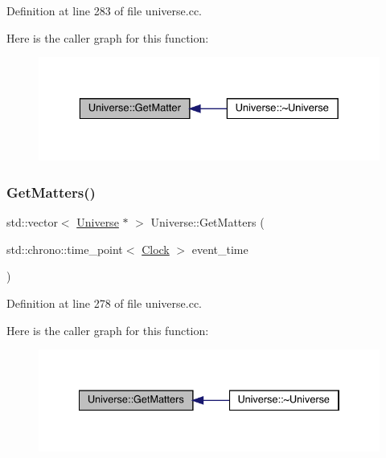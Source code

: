 Definition at line 283 of file universe.\+cc.

Here is the caller graph for this function\+:
\nopagebreak
\begin{figure}[H]
\begin{center}
\leavevmode
\includegraphics[width=329pt]{class_universe_a69de663cf2e32e65ed28c44ae666db3a_icgraph}
\end{center}
\end{figure}
\mbox{\label{class_universe_a4307a62e183fed8cf2b92be0f6014688}} 
\subsubsection{\texorpdfstring{Get\+Matters()}{GetMatters()}}
{\footnotesize\ttfamily std\+::vector$<$ \hyperlink{class_universe}{Universe} $\ast$ $>$ Universe\+::\+Get\+Matters (\begin{DoxyParamCaption}\item[{std\+::chrono\+::time\+\_\+point$<$ \hyperlink{universe_8h_a0ef8d951d1ca5ab3cfaf7ab4c7a6fd80}{Clock} $>$}]{event\+\_\+time }\end{DoxyParamCaption})}



Definition at line 278 of file universe.\+cc.

Here is the caller graph for this function\+:
\nopagebreak
\begin{figure}[H]
\begin{center}
\leavevmode
\includegraphics[width=334pt]{class_universe_a4307a62e183fed8cf2b92be0f6014688_icgraph}
\end{center}
\end{figure}
\mbox{\label{class_universe_aaa03fb8178d790afd992dd094bb64b47}} 
